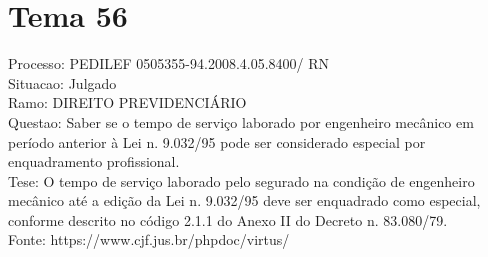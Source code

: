 \documentclass[12pt]{article}
\begin{document}
\section*{Tema 56}
Processo: PEDILEF 0505355-94.2008.4.05.8400/ RN\\
Situacao: Julgado\\
Ramo: DIREITO PREVIDENCIÁRIO\\
Questao: Saber se o tempo de serviço laborado por engenheiro mecânico em período anterior à Lei n. 9.032/95 pode ser considerado especial por enquadramento profissional.\\
Tese: O tempo de serviço laborado pelo segurado na condição de engenheiro mecânico até a edição da Lei n. 9.032/95 deve ser enquadrado como especial, conforme descrito no código 2.1.1 do Anexo II do Decreto n. 83.080/79.\\
Fonte: https://www.cjf.jus.br/phpdoc/virtus/
\end{document}

